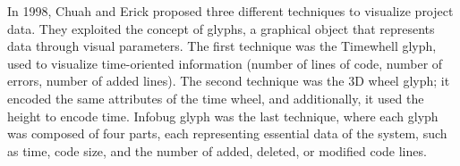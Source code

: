 \bigbreak
In 1998, Chuah and Erick \cite{Chuah1998} proposed three different techniques to visualize project data. 
They exploited the concept of glyphs, a graphical object that represents data through visual parameters. 
The first technique was the Timewhell glyph, used to visualize time-oriented information (number of lines of code, number of errors, number of added lines). 
The second technique was the 3D wheel glyph; it encoded the same attributes of the time wheel, and additionally, it used the height to encode time. 
Infobug glyph was the last technique, where each glyph was composed of four parts, each representing essential data of the system, such as time, code size, and the number of added, deleted, or modified code lines. \newline

